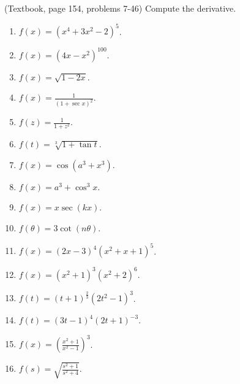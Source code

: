 \begin{problem}(Textbook, page 154, problems 7-46) Compute the derivative.
\begin{multicols}{3}
\begin{enumerate}
\item $\displaystyle f(x)= (x^4+3x^2-2)^5$.

\item $\displaystyle f(x)= (4x-x^2)^{100}$.

\item $\displaystyle f(x)= \sqrt{1-2x}$.

\item $\displaystyle f(x)= \frac{1}{(1+\sec x)^2}$.

\answer{$ $}
\item $\displaystyle f(z)=\frac{1}{1+z^2} $.

\answer{$ $}
\item $\displaystyle f(t)= \sqrt[3]{1+\tan t}$.

\answer{$ $}
\item $\displaystyle f(x)=\cos (a^3+x^3) $.

\answer{$ $}
\item $\displaystyle f(x)= a^3+\cos^3 x$.

\answer{$ $}
\item $\displaystyle f(x)= x\sec (kx) $.

\answer{$ $}
\item $\displaystyle f(\theta)= 3\cot (n\theta)$.

\answer{$ $}
\item $\displaystyle f(x)= (2x - 3)^4 (x^2 + x + 1)^5$.

\answer{$ $}
\item $\displaystyle f(x)= (x^2+1)^3(x^2+2)^6$.

\answer{$ $}
\item $\displaystyle f(t)= (t+1)^{\frac{2}{3}}(2t^2-1)^3$.

\answer{$ $}
\item $\displaystyle f(t)= (3t-1)^4(2t+1)^{-3}$.

\answer{$ $}
\item $\displaystyle f(x)=\left(\frac{x^2+1}{x^2-1} \right)^3 $.

\answer{$ $}
\item $\displaystyle f(s)= \sqrt{\frac{s^2+1}{s^2+4}}$.


\end{enumerate}
\end{multicols}
\end{problem}
